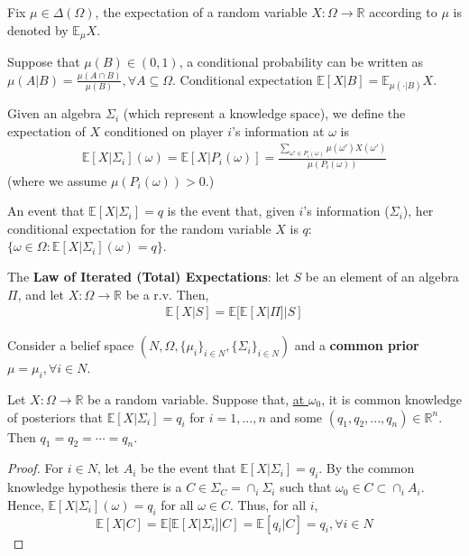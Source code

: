 \documentclass[11pt]{elegantbook_2}
\begin{document}
Fix $\mu\in\Delta(\Omega)$, the expectation of a random variable $X:\Omega \rightarrow \mathbb{R}$ according to $\mu$ is denoted by $\mathbb{E}_\mu X$.

Suppose that $\mu(B)\in(0,1)$, a conditional probability can be written as $\mu(A|B)=\frac{\mu(A\cap B)}{\mu(B)},\forall A\subseteq \Omega$. Conditional expectation $\mathbb{E}[X|B]=\mathbb{E}_{\mu(\cdot|B)}X$.

Given an algebra $\Sigma_i$ (which represent a knowledge space), we define the expectation of $X$ conditioned on player $i$'s information at $\omega$ is
\begin{equation}
    \begin{aligned}
        \mathbb{E}[X|\Sigma_i](\omega)=\mathbb{E}[X|P_i(\omega)]=\frac{\sum_{\omega'\in P_i(\omega)}\mu(\omega')X(\omega')}{\mu(P_i(\omega))}
    \end{aligned}
    \nonumber
\end{equation}
(where we assume $\mu(P_i(\omega))>0$.)

An event that $\mathbb{E}[X|\Sigma_i]=q$ is the event that, given $i$'s information ($\Sigma_i$), her conditional expectation for the random variable $X$ is $q$: $\{\omega\in\Omega:\mathbb{E}[X|\Sigma_i](\omega)=q\}$.

\begin{proposition}
    The \textbf{Law of Iterated (Total) Expectations}: let $S$ be an element of an algebra $\Pi$, and let $X:\Omega \rightarrow \mathbb{R}$ be a r.v. Then,
    \begin{equation}
        \begin{aligned}
            \mathbb{E}[X|S]=\mathbb{E}[\mathbb{E}[X|\Pi]|S]
        \end{aligned}
        \nonumber
    \end{equation}
\end{proposition}

Consider a belief space $\left(N,\Omega,\{\mu_i\}_{i\in N},\{\Sigma_i\}_{i\in N}\right)$ and a \textbf{common prior} $\mu=\mu_i,\forall i\in N$.

\begin{theorem}
    Let $X:\Omega \rightarrow \mathbb{R}$ be a random variable. Suppose that, \underline{at $\omega_0$}, it is common knowledge of posteriors that $\mathbb{E}[X|\Sigma_i]=q_i$ for $i=1,...,n$ and some $(q_1,q_2,...,q_n)\in \mathbb{R}^n$. Then $q_1=q_2=\cdots =q_n$.
\end{theorem}
\begin{proof}
    For $i\in N$, let $A_i$ be the event that $\mathbb{E}[X|\Sigma_i]=q_i$. By the common knowledge hypothesis there is a $C\in \Sigma_C=\cap_i\Sigma_i$ such that $\omega_0\in C\subset \cap_i A_i$. Hence, $\mathbb{E}[X|\Sigma_i](\omega)=q_i$ for all $\omega\in C$. Thus, for all $i$, $$\mathbb{E}[X|C]=\mathbb{E}[\mathbb{E}[X|\Sigma_i]|C]=\mathbb{E}[q_i|C]=q_i,\forall i\in N$$
\end{proof}
\end{document}
